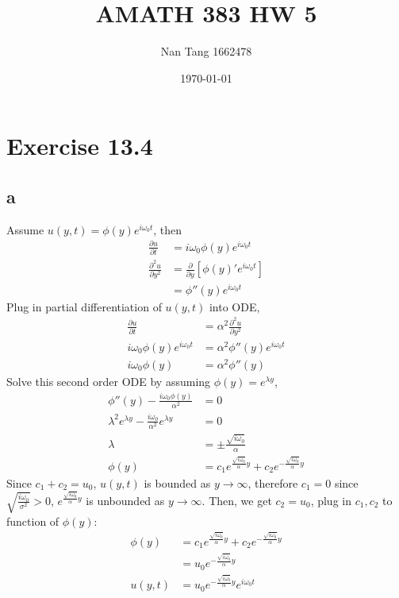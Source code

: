\documentclass[11pt,letterpaper]{article}
\title{AMATH 383 HW 5}
\author{Nan Tang 1662478}
\date{\today}
\begin{document}
\maketitle

\section*{Exercise 13.4}
\subsection*{a}
\noindent Assume $u(y,t) = \phi(y) e^{i \omega_0 t}$, then 
\begin{align*}
\frac{\partial u}{\partial t} &=  i \omega_0 \phi(y) e^{i \omega_0 t} \\
\frac{\partial^2 u}{\partial y^2} &= \frac{\partial}{\partial y} [\phi(y)' e^{i \omega_0 t}] \\
&= \phi''(y) e^{i \omega_0 t}
\end{align*}
\noindent Plug in partial differentiation of $u(y,t)$ into ODE, 
\begin{align*}
\frac{\partial u}{\partial t} &= \alpha^2 \frac{\partial^2 u}{\partial y^2} \\
 i \omega_0 \phi(y) e^{i \omega_0 t} &= \alpha^2 \phi''(y) e^{i \omega_0 t} \\
 i \omega_0 \phi(y) &= \alpha^2 \phi''(y) 
\end{align*}
\noindent Solve this second order ODE by assuming $\phi(y) = e^{\lambda y}$,
\begin{align*}
\phi''(y) - \frac{i \omega_0 \phi(y)}{\alpha^2} &= 0 \\
\lambda^2 e^{\lambda y} - \frac{i \omega_0}{\alpha^2}  e^{\lambda y} &= 0 \\
\lambda &= \pm \frac{\sqrt{i \omega_0}}{\alpha} \\
\phi(y) &= c_1 e^{\frac{\sqrt{i \omega_0}}{\alpha} y} + c_2 e^{-\frac{\sqrt{i \omega_0}}{\alpha} y}
\end{align*}
\noindent Since $c_1 + c_2 = u_0$, $u(y,t)$ is bounded as $y \rightarrow \infty$, therefore $c_1 = 0$ since $\sqrt{\frac{i \omega_0}{\sigma^2}} > 0$, $e^{\frac{\sqrt{i \omega_0}}{\alpha} y}$ is unbounded as $y \rightarrow \infty$. Then, we get $c_2 = u_0$, plug in $c_1, c_2$ to function of $\phi(y)$: \\
\begin{align*}
\phi(y) &=  c_1 e^{\frac{\sqrt{i \omega_0}}{\alpha} y} + c_2 e^{-\frac{\sqrt{i \omega_0}}{\alpha} y} \\
&= u_0 e^{-\frac{\sqrt{i \omega_0}}{\alpha} y} \\
u(y,t) &= u_0 e^{-\frac{\sqrt{i \omega_0}}{\alpha} y} e^{i \omega_0 t}
\end{align*} \\
\end{document}
